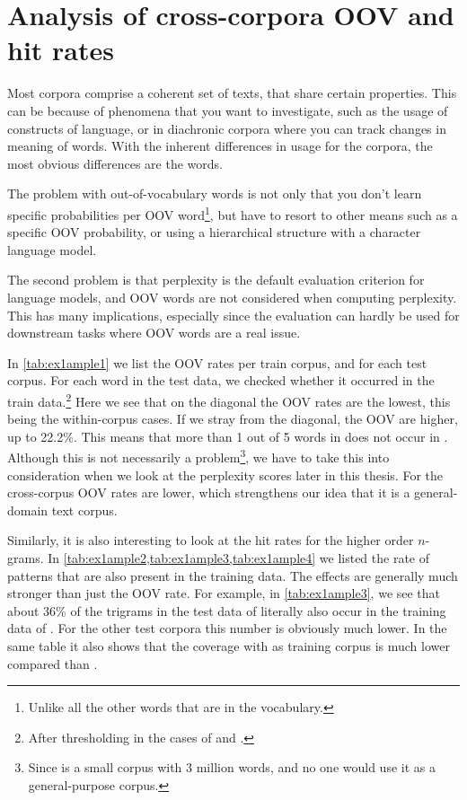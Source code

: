     \section{Analysis of cross-corpora OOV and hit rates}
Most corpora comprise a coherent set of texts, that share certain properties. This can be because of phenomena that you want to investigate, such as the usage of constructs of language, or in diachronic corpora where you can track changes in meaning of words. With the inherent differences in usage for the corpora, the most obvious differences are the words.

The problem with out-of-vocabulary words is not only that you don't learn specific probabilities per OOV word\footnote{Unlike all the other words that are in the vocabulary.}, but have to resort to other means such as a specific OOV probability, or using a hierarchical structure with a character language model.

The second problem is that perplexity is the default evaluation criterion for language models, and OOV words are not considered when computing perplexity. This has many implications, especially since the evaluation can hardly be used for downstream tasks where OOV words are a real issue.

In \cref{tab:ex1ample1} we list the OOV rates per train corpus, and for each test corpus. For each word in the test data, we checked whether it occurred in the train data.\footnote{After thresholding in the cases of \obw and \wp.}
Here we see that on the diagonal the OOV rates are the lowest, this being the within-corpus cases. If we stray from the diagonal, the OOV are higher, up to 22.2\%. This means that more than 1 out of 5 words in \wp does not occur in \emea. Although this is not necessarily a problem\footnote{Since \emea is a small corpus with 3 million words, and no one would use it as a general-purpose corpus.}, we have to take this into consideration when we look at the perplexity scores later in this thesis.
For \obw the cross-corpus OOV rates are lower, which strengthens our idea that it is a general-domain text corpus.

Similarly, it is also interesting to look at the hit rates for the higher order $n$-grams. In \cref{tab:ex1ample2,tab:ex1ample3,tab:ex1ample4} we listed the rate of patterns that are also present in the training data. The effects are generally much stronger than just the OOV rate. For example, in \cref{tab:ex1ample3}, we see that about 36\% of the trigrams in the test data of \obw literally also occur in the training data of \obw. For the other test corpora this number is obviously much lower. In the same table it also shows that the coverage with \emea as training corpus is much lower compared than \obw.
    
